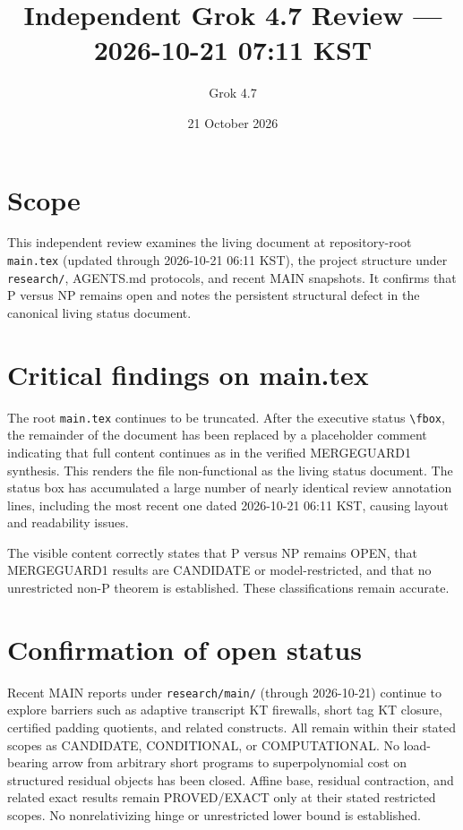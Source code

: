 \documentclass[11pt]{article}
\title{Independent Grok 4.7 Review --- 2026-10-21 07:11 KST}
\author{Grok 4.7}
\date{21 October 2026}
\begin{document}
\maketitle

\begin{center}
\end{center}

\section{Scope}
This independent review examines the living document at repository-root \texttt{main.tex} (updated through 2026-10-21 06:11 KST), the project structure under \texttt{research/}, AGENTS.md protocols, and recent MAIN snapshots. It confirms that P versus NP remains open and notes the persistent structural defect in the canonical living status document.

\section{Critical findings on main.tex}
The root \texttt{main.tex} continues to be truncated. After the executive status \texttt{\textbackslash fbox}, the remainder of the document has been replaced by a placeholder comment indicating that full content continues as in the verified MERGEGUARD1 synthesis. This renders the file non-functional as the living status document. The status box has accumulated a large number of nearly identical review annotation lines, including the most recent one dated 2026-10-21 06:11 KST, causing layout and readability issues.

The visible content correctly states that P versus NP remains OPEN, that MERGEGUARD1 results are CANDIDATE or model-restricted, and that no unrestricted non-P theorem is established. These classifications remain accurate.

\section{Confirmation of open status}
Recent MAIN reports under \texttt{research/main/} (through 2026-10-21) continue to explore barriers such as adaptive transcript KT firewalls, short tag KT closure, certified padding quotients, and related constructs. All remain within their stated scopes as CANDIDATE, CONDITIONAL, or COMPUTATIONAL. No load-bearing arrow from arbitrary short programs to superpolynomial cost on structured residual objects has been closed. Affine base, residual contraction, and related exact results remain PROVED/EXACT only at their stated restricted scopes. No nonrelativizing hinge or unrestricted lower bound is established.
\end{document}
